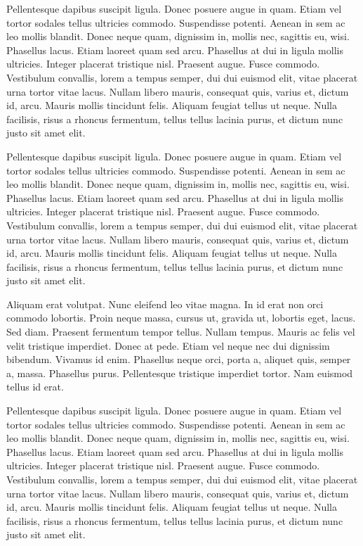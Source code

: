 Pellentesque dapibus suscipit ligula.  Donec posuere augue in quam.
Etiam vel tortor sodales tellus ultricies commodo.  Suspendisse
potenti.  Aenean in sem ac leo mollis blandit.  Donec neque quam,
dignissim in, mollis nec, sagittis eu, wisi.  Phasellus lacus.  Etiam
laoreet quam sed arcu.  Phasellus at dui in ligula mollis ultricies.
Integer placerat tristique nisl.  Praesent augue.  Fusce commodo.
Vestibulum convallis, lorem a tempus semper, dui dui euismod elit,
vitae placerat urna tortor vitae lacus.  Nullam libero mauris,
consequat quis, varius et, dictum id, arcu.  Mauris mollis tincidunt
felis.  Aliquam feugiat tellus ut neque.  Nulla facilisis, risus a
rhoncus fermentum, tellus tellus lacinia purus, et dictum nunc justo
sit amet elit.

Pellentesque dapibus suscipit ligula.  Donec posuere augue in quam.
Etiam vel tortor sodales tellus ultricies commodo.  Suspendisse
potenti.  Aenean in sem ac leo mollis blandit.  Donec neque quam,
dignissim in, mollis nec, sagittis eu, wisi.  Phasellus lacus.  Etiam
laoreet quam sed arcu.  Phasellus at dui in ligula mollis ultricies.
Integer placerat tristique nisl.  Praesent augue.  Fusce commodo.
Vestibulum convallis, lorem a tempus semper, dui dui euismod elit,
vitae placerat urna tortor vitae lacus.  Nullam libero mauris,
consequat quis, varius et, dictum id, arcu.  Mauris mollis tincidunt
felis.  Aliquam feugiat tellus ut neque.  Nulla facilisis, risus a
rhoncus fermentum, tellus tellus lacinia purus, et dictum nunc justo
sit amet elit.

Aliquam erat volutpat.  Nunc eleifend leo vitae magna.  In id erat non
orci commodo lobortis.  Proin neque massa, cursus ut, gravida ut,
lobortis eget, lacus.  Sed diam.  Praesent fermentum tempor tellus.
Nullam tempus.  Mauris ac felis vel velit tristique imperdiet.  Donec
at pede.  Etiam vel neque nec dui dignissim bibendum.  Vivamus id
enim.  Phasellus neque orci, porta a, aliquet quis, semper a, massa.
Phasellus purus.  Pellentesque tristique imperdiet tortor.  Nam
euismod tellus id erat.

Pellentesque dapibus suscipit ligula.  Donec posuere augue in quam.
Etiam vel tortor sodales tellus ultricies commodo.  Suspendisse
potenti.  Aenean in sem ac leo mollis blandit.  Donec neque quam,
dignissim in, mollis nec, sagittis eu, wisi.  Phasellus lacus.  Etiam
laoreet quam sed arcu.  Phasellus at dui in ligula mollis ultricies.
Integer placerat tristique nisl.  Praesent augue.  Fusce commodo.
Vestibulum convallis, lorem a tempus semper, dui dui euismod elit,
vitae placerat urna tortor vitae lacus.  Nullam libero mauris,
consequat quis, varius et, dictum id, arcu.  Mauris mollis tincidunt
felis.  Aliquam feugiat tellus ut neque.  Nulla facilisis, risus a
rhoncus fermentum, tellus tellus lacinia purus, et dictum nunc justo
sit amet elit.


